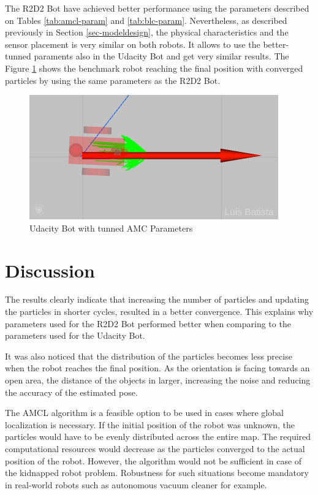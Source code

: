 \documentclass[10pt,journal,compsoc]{IEEEtran}
\begin{document}
The R2D2 Bot have achieved better performance using the parameters described on Tables \ref{tab:amcl-param} and \ref{tab:blc-param}. Nevertheless, as described previously in Section \ref{sec-modeldesign}, the physical characteristics and the sensor placement is very similar on both robots. It allows to use the better-tunned paraments also in the Udacity Bot and get very similar results. The Figure \ref{fig:ub-final2} shows the benchmark robot reaching the final position with converged particles by using the same parameters as the R2D2 Bot.

\begin{figure}[H]
\centering
  \includegraphics[width=0.6\linewidth]{ub_final2.png}
  \caption{Udacity Bot with tunned AMC Parameters}
  \label{fig:ub-final2}
\end{figure}


\section{Discussion}


The results clearly indicate that increasing the number of particles and updating the particles in shorter cycles, resulted in a better convergence. This explains why parameters used for the R2D2 Bot performed better when comparing to the parameters used for the Udacity Bot.

It was also noticed that the distribution of the particles becomes less precise when the robot reaches the final position. As the orientation is facing towards an open area, the distance of the objects in larger, increasing the noise and reducing the accuracy of the estimated pose.

The AMCL algorithm is a feasible option to be used in cases where global localization is necessary. If the initial position of the robot was unknown, the particles would have to be evenly distributed across the entire map. The required computational resources would decrease as the particles converged to the actual position of the robot. However, the algorithm would not be sufficient in case of the kidnapped robot problem. Robustness for such situations become mandatory in real-world robots such as autonomous vacuum cleaner for example.
\end{document}
